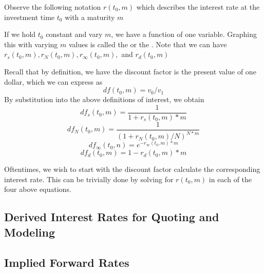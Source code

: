 \documentclass[12pt]{scrartcl}
\begin{document}
{\begin{note}
    Observe the following notation $r(t_0, m)$ which describes the interest rate at the investment time $t_0$ with a maturity $m$
\end{note}

\begin{note}
    If we hold $t_0$ constant and vary $m$, we have a function of one variable. Graphing this with varying $m$ values is called the  or the . Note that we can have $r_s(t_0, m), r_N(t_0, m), r_\infty(t_0, m), $ and $r_d(t_0, m)$
\end{note}

\begin{note}
    Recall that by definition, we have the discount factor is the present value of one dollar, which we can express as 
    \[df(t_0, m) = v_0 / v_1\]
    By substitution into the above definitions of interest, we obtain
    \[df_s(t_0, m) = \dfrac{1}{1 + r_s(t_0, m) * m}\]
    \[df_N(t_0, m) = \dfrac{1}{(1 + r_N(t_0, m) / N)^{N * m}}\]
    \[df_\infty(t_0, n) = e^{-r_\infty(t_0, m)* m}\]
    \[df_d(t_0, m) = 1 - r_d(t_0, m) * m\]

    Oftentimes, we wish to start with the discount factor calculate the corresponding interest rate. This can be trivially done by solving for $r(t_0, m)$ in each of the four above equations.
\end{note}

\subsection{Derived Interest Rates for Quoting and Modeling}



\subsection{Implied Forward Rates}

}
\end{document}
